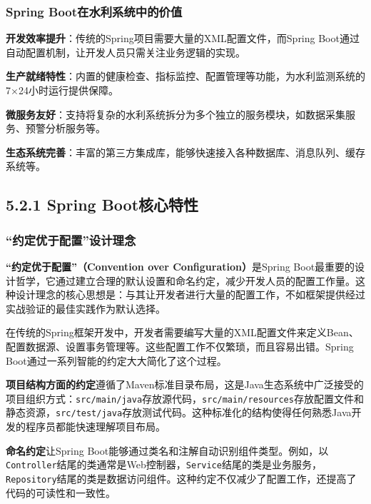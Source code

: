 \subsubsection{Spring Boot在水利系统中的价值}\label{spring-bootux5728ux6c34ux5229ux7cfbux7edfux4e2dux7684ux4ef7ux503c}

\textbf{开发效率提升}：传统的Spring项目需要大量的XML配置文件，而Spring Boot通过自动配置机制，让开发人员只需关注业务逻辑的实现。

\textbf{生产就绪特性}：内置的健康检查、指标监控、配置管理等功能，为水利监测系统的7×24小时运行提供保障。

\textbf{微服务友好}：支持将复杂的水利系统拆分为多个独立的服务模块，如数据采集服务、预警分析服务等。

\textbf{生态系统完善}：丰富的第三方集成库，能够快速接入各种数据库、消息队列、缓存系统等。

\subsection{5.2.1 Spring Boot核心特性}\label{spring-bootux6838ux5fc3ux7279ux6027}

\subsubsection{``约定优于配置''设计理念}\label{ux7ea6ux5b9aux4f18ux4e8eux914dux7f6eux8bbeux8ba1ux7406ux5ff5}

\textbf{``约定优于配置''（Convention over Configuration）}是Spring Boot最重要的设计哲学，它通过建立合理的默认设置和命名约定，减少开发人员的配置工作量。这种设计理念的核心思想是：与其让开发者进行大量的配置工作，不如框架提供经过实战验证的最佳实践作为默认选择。

在传统的Spring框架开发中，开发者需要编写大量的XML配置文件来定义Bean、配置数据源、设置事务管理等。这些配置工作不仅繁琐，而且容易出错。Spring Boot通过一系列智能的约定大大简化了这个过程。

\textbf{项目结构方面的约定}遵循了Maven标准目录布局，这是Java生态系统中广泛接受的项目组织方式：\texttt{src/main/java}存放源代码，\texttt{src/main/resources}存放配置文件和静态资源，\texttt{src/test/java}存放测试代码。这种标准化的结构使得任何熟悉Java开发的程序员都能快速理解项目布局。

\textbf{命名约定}让Spring Boot能够通过类名和注解自动识别组件类型。例如，以\texttt{Controller}结尾的类通常是Web控制器，\texttt{Service}结尾的类是业务服务，\texttt{Repository}结尾的类是数据访问组件。这种约定不仅减少了配置工作，还提高了代码的可读性和一致性。

